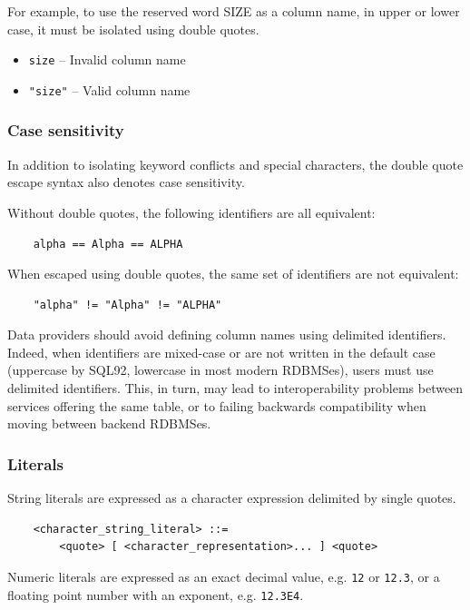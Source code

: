 \documentclass[11pt,a4paper]{ivoa}
\begin{document}
For example, to use the reserved word SIZE as a column name, in upper or lower case,
it must be isolated using double quotes.

\begin{itemize}
    \item \verb:size: -- Invalid column name
    \item \verb:"size": -- Valid column name
\end{itemize}

\subsubsection{Case sensitivity}
\label{sec:adql.case}

In addition to isolating keyword conflicts and special characters,
the double quote escape syntax also denotes case sensitivity.

Without double quotes, the following identifiers are all equivalent:
\begin{verbatim}
    alpha == Alpha == ALPHA
\end{verbatim}

When escaped using double quotes, the same set of identifiers are not equivalent:
\begin{verbatim}
    "alpha" != "Alpha" != "ALPHA"
\end{verbatim}

Data providers should avoid defining column names using delimited identifiers.
Indeed, when identifiers are mixed-case or are not written in the default case
(uppercase by SQL92, lowercase in most modern RDBMSes), users must use delimited
identifiers. This, in turn, may lead to interoperability problems between
services offering the same table, or to failing backwards compatibility when
moving between backend RDBMSes.

\subsubsection{Literals}
\label{sec:literals}

String literals are expressed as a character expression delimited by single quotes.

\begin{verbatim}
    <character_string_literal> ::=
        <quote> [ <character_representation>... ] <quote>
\end{verbatim}

Numeric literals are expressed as an exact decimal value, e.g. \verb:12: or
\verb:12.3:, or a floating point number with an exponent, e.g. \verb:12.3E4:.
\end{document}

